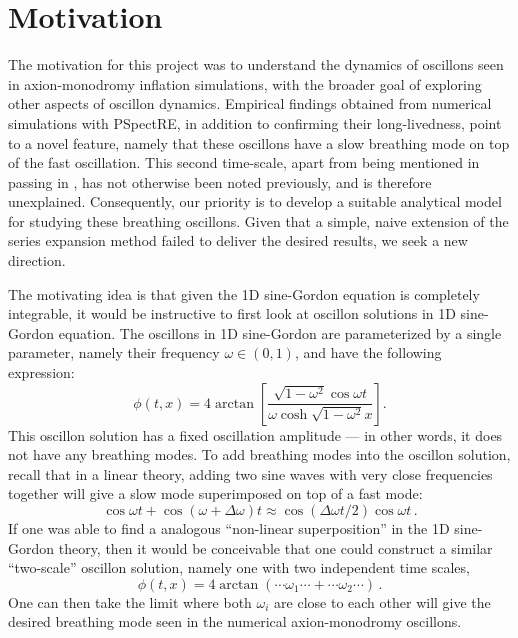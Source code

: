 \documentclass[11pt]{book}
\begin{document}
\section{Motivation}
The motivation for this project was to understand the dynamics of oscillons seen in axion-monodromy inflation simulations, with the broader goal of exploring other aspects of oscillon dynamics. Empirical findings obtained from numerical simulations with PSpectRE, in addition to confirming their long-livedness, point to a novel feature, namely that these oscillons have a slow breathing mode on top of the fast oscillation. This second time-scale, apart from being mentioned in passing in \cite{Salmi:2012ta}, has not otherwise been noted previously, and is therefore unexplained. Consequently, our priority is to develop a suitable analytical model for studying these breathing oscillons. Given that a simple, naive extension of the series expansion method failed to deliver the desired results, we seek a new direction.

The motivating idea is that given the 1D sine-Gordon equation is completely integrable, it would be instructive to first look at oscillon solutions in 1D sine-Gordon equation. The oscillons in 1D sine-Gordon are parameterized by a single parameter, namely their frequency $\omega\in(0,1)$, and have the following expression:
\begin{equation}\label{onescale}
  \phi(t,x) = 4 \arctan\left[ \frac{\sqrt{1-\omega^2} \cos \omega t}{\omega \cosh \sqrt{1-\omega^2} x} \right].
\end{equation}
This oscillon solution has a fixed oscillation amplitude --- in other words, it does not have any breathing modes. To add breathing modes into the oscillon solution, recall that in a linear theory, adding two sine waves with very close frequencies together will give a slow mode superimposed on top of a fast mode:
\begin{equation}
  \cos \omega t  + \cos(\omega+ \Delta\omega)t\approx \cos (\Delta\omega t/2) \cos\omega t\,.
\end{equation}
If one was able to find a analogous ``non-linear superposition'' in the 1D sine-Gordon theory, then it would be conceivable that one could construct a similar ``two-scale'' oscillon solution, namely one with two independent time scales,
\begin{equation}
  \phi(t,x) = 4\arctan (\cdots \omega_1 \cdots + \cdots \omega_2 \cdots)\,.
\end{equation}
One can then take the limit where both $\omega_i$ are close to each other will give the desired breathing mode seen in the numerical axion-monodromy oscillons.
\end{document}

